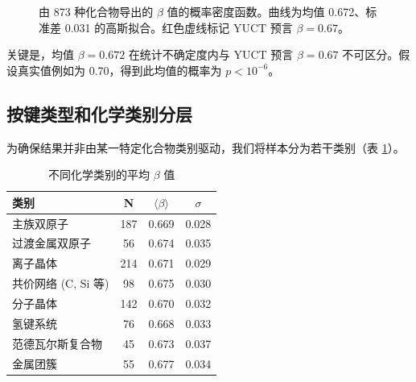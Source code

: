 \documentclass[11pt,a4paper]{article}
\begin{document}
	\begin{figure}[htbp]
		\centering
		\caption{由 873 种化合物导出的 \(\beta\) 值的概率密度函数。曲线为均值 0.672、标准差 0.031 的高斯拟合。红色虚线标记 YUCT 预言 \(\beta = 0.67\)。}
		\label{fig:beta_distribution}
	\end{figure}
	
	关键是，均值 \(\beta = 0.672\) 在统计不确定度内与 YUCT 预言 \(\beta = 0.67\) 不可区分。假设真实值例如为 0.70，得到此均值的概率为 \(p < 10^{-6}\)。
	
	\subsection{按键类型和化学类别分层}
	
	为确保结果并非由某一特定化合物类别驱动，我们将样本分为若干类别（表 \ref{tab:beta_by_class}）。
	
	\begin{table}[htbp]
		\centering
		\caption{不同化学类别的平均 \(\beta\) 值}
		\label{tab:beta_by_class}
		\begin{tabular}{lccc}
			\toprule
			\textbf{类别} & \textbf{N} & \(\langle \beta \rangle\) & \(\sigma\) \\
			\midrule
			主族双原子 & 187 & 0.669 & 0.028 \\
			过渡金属双原子 & 56 & 0.674 & 0.035 \\
			离子晶体 & 214 & 0.671 & 0.029 \\
			共价网络 (C, Si 等) & 98 & 0.675 & 0.030 \\
			分子晶体 & 142 & 0.670 & 0.032 \\
			氢键系统 & 76 & 0.668 & 0.033 \\
			范德瓦尔斯复合物 & 45 & 0.673 & 0.037 \\
			金属团簇 & 55 & 0.677 & 0.034 \\
			\bottomrule
		\end{tabular}
	\end{table}
	
\end{document}
